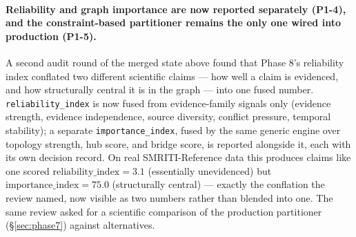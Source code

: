 \paragraph{Reliability and graph importance are now reported separately
(P1-4), and the constraint-based partitioner remains the only one wired
into production (P1-5).} A second audit round of the merged state
above found that Phase 8's reliability index conflated two different
scientific claims --- how well a claim is evidenced, and how structurally
central it is in the graph --- into one fused number. \texttt{reliability\_index}
is now fused from evidence-family signals only (evidence strength,
evidence independence, source diversity, conflict pressure, temporal
stability); a separate \texttt{importance\_index}, fused by the same
generic engine over topology strength, hub score, and bridge score, is
reported alongside it, each with its own decision record. On real
SMRITI-Reference data this produces claims like one scored
$\mathrm{reliability\_index}=3.1$ (essentially unevidenced) but
$\mathrm{importance\_index}=75.0$ (structurally central) --- exactly the
conflation the review named, now visible as two numbers rather than
blended into one. The same review asked for a scientific comparison of
the production partitioner (\S\ref{sec:phase7}) against alternatives.



